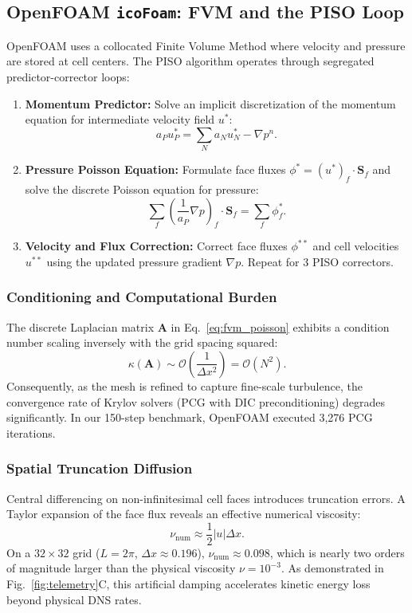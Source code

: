 \documentclass[10pt,a4paper,twocolumn]{article}
\theoremstyle{definition}
\begin{document}
\subsection{OpenFOAM \texttt{icoFoam}: FVM and the PISO Loop}
OpenFOAM uses a collocated Finite Volume Method where velocity and pressure are stored at cell centers. The PISO algorithm operates through segregated predictor-corrector loops:
\begin{enumerate}[leftmargin=*]
    \item \textbf{Momentum Predictor:} Solve an implicit discretization of the momentum equation for intermediate velocity field $u^*$:
    \begin{equation}
    a_P u_P^* = \sum_N a_N u_N^* - \nabla p^n.
    \end{equation}
    \item \textbf{Pressure Poisson Equation:} Formulate face fluxes $\phi^* = (u^*)_f \cdot \mathbf{S}_f$ and solve the discrete Poisson equation for pressure:
    \begin{equation}
    \sum_f \left( \frac{1}{a_P} \nabla p \right)_f \cdot \mathbf{S}_f = \sum_f \phi_f^*.
    \label{eq:fvm_poisson}
    \end{equation}
    \item \textbf{Velocity and Flux Correction:} Correct face fluxes $\phi^{**}$ and cell velocities $u^{**}$ using the updated pressure gradient $\nabla p$. Repeat for 3 PISO correctors.
\end{enumerate}

\subsubsection{Conditioning and Computational Burden}
The discrete Laplacian matrix $\mathbf{A}$ in Eq.~\eqref{eq:fvm_poisson} exhibits a condition number scaling inversely with the grid spacing squared:
\begin{equation}
\kappa(\mathbf{A}) \sim \mathcal{O}\left( \frac{1}{\Delta x^2} \right) = \mathcal{O}(N^2).
\end{equation}
Consequently, as the mesh is refined to capture fine-scale turbulence, the convergence rate of Krylov solvers (PCG with DIC preconditioning) degrades significantly. In our 150-step benchmark, OpenFOAM executed 3,276 PCG iterations.

\subsubsection{Spatial Truncation Diffusion}
Central differencing on non-infinitesimal cell faces introduces truncation errors. A Taylor expansion of the face flux reveals an effective numerical viscosity:
\begin{equation}
\nu_{\text{num}} \approx \frac{1}{2} |u| \Delta x.
\end{equation}
On a $32 \times 32$ grid ($L=2\pi$, $\Delta x \approx 0.196$), $\nu_{\text{num}} \approx 0.098$, which is nearly two orders of magnitude larger than the physical viscosity $\nu = 10^{-3}$. As demonstrated in Fig.~\ref{fig:telemetry}C, this artificial damping accelerates kinetic energy loss beyond physical DNS rates.
\end{document}
